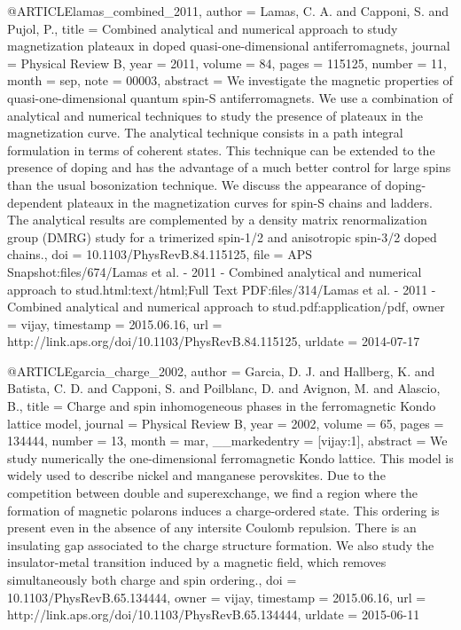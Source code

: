 @ARTICLE{lamas_combined_2011,
  author = {Lamas, C. A. and Capponi, S. and Pujol, P.},
  title = {Combined analytical and numerical approach to study magnetization
	plateaux in doped quasi-one-dimensional antiferromagnets},
  journal = {Physical Review B},
  year = {2011},
  volume = {84},
  pages = {115125},
  number = {11},
  month = sep,
  note = {00003},
  abstract = {We investigate the magnetic properties of quasi-one-dimensional quantum
	spin-S antiferromagnets. We use a combination of analytical and numerical
	techniques to study the presence of plateaux in the magnetization
	curve. The analytical technique consists in a path integral formulation
	in terms of coherent states. This technique can be extended to the
	presence of doping and has the advantage of a much better control
	for large spins than the usual bosonization technique. We discuss
	the appearance of doping-dependent plateaux in the magnetization
	curves for spin-S chains and ladders. The analytical results are
	complemented by a density matrix renormalization group (DMRG) study
	for a trimerized spin-1/2 and anisotropic spin-3/2 doped chains.},
  doi = {10.1103/PhysRevB.84.115125},
  file = {APS Snapshot:files/674/Lamas et al. - 2011 - Combined analytical and numerical approach to stud.html:text/html;Full Text PDF:files/314/Lamas et al. - 2011 - Combined analytical and numerical approach to stud.pdf:application/pdf},
  owner = {vijay},
  timestamp = {2015.06.16},
  url = {http://link.aps.org/doi/10.1103/PhysRevB.84.115125},
  urldate = {2014-07-17}
}

@ARTICLE{garcia_charge_2002,
  author = {Garcia, D. J. and Hallberg, K. and Batista, C. D. and Capponi, S.
	and Poilblanc, D. and Avignon, M. and Alascio, B.},
  title = {Charge and spin inhomogeneous phases in the ferromagnetic {Kondo}
	lattice model},
  journal = {Physical Review B},
  year = {2002},
  volume = {65},
  pages = {134444},
  number = {13},
  month = mar,
  __markedentry = {[vijay:1]},
  abstract = {We study numerically the one-dimensional ferromagnetic Kondo lattice.
	This model is widely used to describe nickel and manganese perovskites.
	Due to the competition between double and superexchange, we find
	a region where the formation of magnetic polarons induces a charge-ordered
	state. This ordering is present even in the absence of any intersite
	Coulomb repulsion. There is an insulating gap associated to the charge
	structure formation. We also study the insulator-metal transition
	induced by a magnetic field, which removes simultaneously both charge
	and spin ordering.},
  doi = {10.1103/PhysRevB.65.134444},
  owner = {vijay},
  timestamp = {2015.06.16},
  url = {http://link.aps.org/doi/10.1103/PhysRevB.65.134444},
  urldate = {2015-06-11}
}

